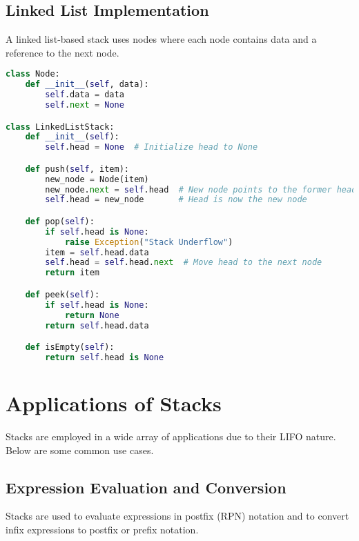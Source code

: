 \subsection{Linked List Implementation}

A linked list-based stack uses nodes where each node contains data and a reference to the next node.

\begin{fullwidth}
\begin{lstlisting}[language=Python]
class Node:
    def __init__(self, data):
        self.data = data
        self.next = None

class LinkedListStack:
    def __init__(self):
        self.head = None  # Initialize head to None

    def push(self, item):
        new_node = Node(item)
        new_node.next = self.head  # New node points to the former head
        self.head = new_node       # Head is now the new node

    def pop(self):
        if self.head is None:
            raise Exception("Stack Underflow")
        item = self.head.data
        self.head = self.head.next  # Move head to the next node
        return item

    def peek(self):
        if self.head is None:
            return None
        return self.head.data

    def isEmpty(self):
        return self.head is None
\end{lstlisting}
\end{fullwidth}

\section{Applications of Stacks}

Stacks are employed in a wide array of applications due to their LIFO nature. Below are some common use cases.

\subsection{Expression Evaluation and Conversion}

Stacks are used to evaluate expressions in postfix (RPN) notation and to convert infix expressions to postfix or prefix notation.

